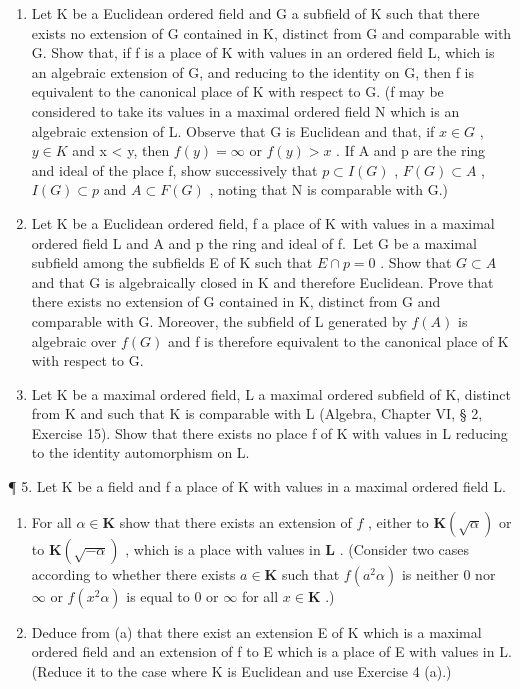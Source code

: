 \begin{enumerate}
\def\labelenumi{(\alph{enumi})}
\item
  Let K be a Euclidean ordered field and G a subfield of K such that there exists no extension of G contained in K, distinct from G and comparable with G. Show that, if f is a place of K with values in an ordered field L, which is an algebraic extension of G, and reducing to the identity on G, then f is equivalent to the canonical place of K with respect to G. (f may be considered to take its values in a maximal ordered field N which is an algebraic extension of L. Observe that G is Euclidean and that, if \(x \in G\) , \(y \in K\) and x \textless{} y, then \(f(y) = \infty\) or \(f(y) > x\) . If A and p are the ring and ideal of the place f, show successively that \(p \subset I(G)\) , \(F(G) \subset A\) , \(I(G) \subset p\) and \(A \subset F(G)\) , noting that N is comparable with G.)
\item
  Let K be a Euclidean ordered field, f a place of K with values in a maximal ordered field L and A and p the ring and ideal of f.~Let G be a maximal subfield among the subfields E of K such that \(E \cap p = 0\) . Show that \(G \subset A\) and that G is algebraically closed in K and therefore Euclidean. Prove that there exists no extension of G contained in K, distinct from G and comparable with G. Moreover, the subfield of L generated by \(f(A)\) is algebraic over \(f(G)\) and f is therefore equivalent to the canonical place of K with respect to G.
\item
  Let K be a maximal ordered field, L a maximal ordered subfield of K, distinct from K and such that K is comparable with L (Algebra, Chapter VI, § 2, Exercise 15). Show that there exists no place f of K with values in L reducing to the identity automorphism on L.
\end{enumerate}

¶ 5. Let K be a field and f a place of K with values in a maximal ordered field L.

\begin{enumerate}
\def\labelenumi{(\alph{enumi})}
\item
  For all \(\alpha \in \mathbf{K}\) show that there exists an extension of \(f\) , either to \(\mathbf{K}(\sqrt{\alpha})\) or to \(\mathbf{K}(\sqrt{-\alpha})\) , which is a place with values in \(\mathbf{L}\) . (Consider two cases according to whether there exists \(a \in \mathbf{K}\) such that \(f(a^2\alpha)\) is neither 0 nor \(\infty\) or \(f(x^2\alpha)\) is equal to 0 or \(\infty\) for all \(x \in \mathbf{K}\) .)
\item
  Deduce from (a) that there exist an extension E of K which is a maximal ordered field and an extension of f to E which is a place of E with values in L. (Reduce it to the case where K is Euclidean and use Exercise 4 (a).)
\end{enumerate}

